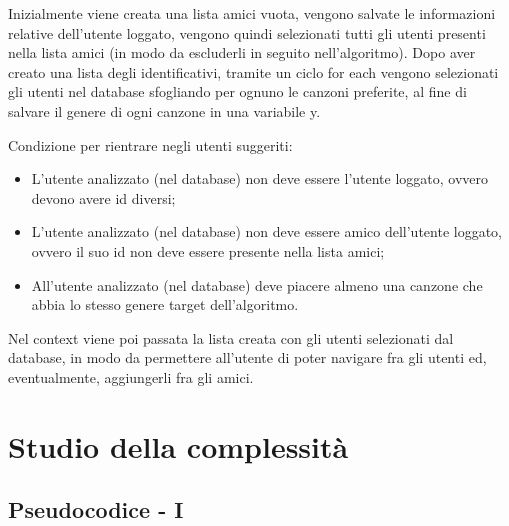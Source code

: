 Inizialmente viene creata una lista amici vuota, vengono salvate le informazioni relative dell'utente loggato, vengono quindi 
selezionati tutti gli utenti presenti nella lista amici (in modo da escluderli in seguito nell'algoritmo).
Dopo aver creato una lista degli identificativi, tramite un ciclo for each vengono selezionati gli utenti nel database 
sfogliando per ognuno le canzoni preferite, al fine di salvare il genere di ogni canzone in una variabile y.

Condizione per rientrare negli utenti suggeriti:
\begin{itemize}
    \item L'utente analizzato (nel database) non deve essere l'utente loggato, ovvero devono avere id diversi;
    \item L'utente analizzato (nel database) non deve essere amico dell'utente loggato, ovvero il suo id non deve essere presente 
    nella lista amici;
    \item All'utente analizzato (nel database) deve piacere almeno una canzone che abbia lo stesso genere target dell'algoritmo.

\end{itemize}

Nel context viene poi passata la lista creata con gli utenti selezionati dal database, in modo da permettere all'utente di poter
navigare fra gli utenti ed, eventualmente, aggiungerli fra gli amici. 




\newpage

\section{Studio della complessità}

\subsection{Pseudocodice - I}

